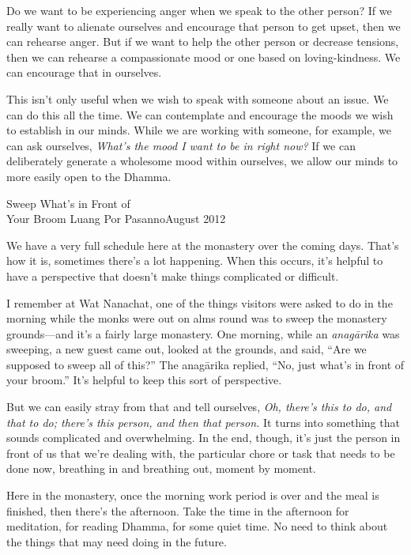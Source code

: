 Do we want to be experiencing anger when we speak to the other person? 
If we really want to alienate ourselves and encourage that person to 
get upset, then we can rehearse anger. But if we want to help the other 
person or decrease tensions, then we can rehearse a compassionate mood 
or one based on loving-kindness. We can encourage that in ourselves.

This isn't only useful when we wish to speak with someone about an 
issue. We can do this all the time. We can contemplate and encourage 
the moods we wish to establish in our minds. While we are working with 
someone, for example, we can ask ourselves, \emph{What's the mood I 
want to be in right now?} If we can deliberately generate a wholesome 
mood within ourselves, we allow our minds to more easily open to the 
Dhamma.

{Sweep What's in Front of\\Your Broom}
{Luang Por Pasanno}{August 2012}

We have a very full schedule here at the monastery over the coming 
days. That's how it is, sometimes there's a lot happening. When this 
occurs, it's helpful to have a perspective that doesn't make things 
complicated or difficult.

I remember at Wat Nanachat, one of the things visitors were asked to do 
in the morning while the monks were out on alms round was to sweep the 
monastery grounds---and it's a fairly large monastery. One morning, 
while an \emph{anagārika} was sweeping, a new guest came out, looked 
at the grounds, and said, ``Are we supposed to sweep all of this?'' The 
anagārika replied, ``No, just what's in front of your broom.'' It's 
helpful to keep this sort of perspective.

But we can easily stray from that and tell ourselves, \emph{Oh, there's 
this to do, and that to do; there's this person, and then that person.} 
It turns into something that sounds complicated and overwhelming. In 
the end, though, it's just the person in front of us that we're dealing 
with, the particular chore or task that needs to be done now, breathing 
in and breathing out, moment by moment.

Here in the monastery, once the morning work period is over and the 
meal is finished, then there's the afternoon. Take the time in the 
afternoon for meditation, for reading Dhamma, for some quiet time. No 
need to think about the things that may need doing in the future.

